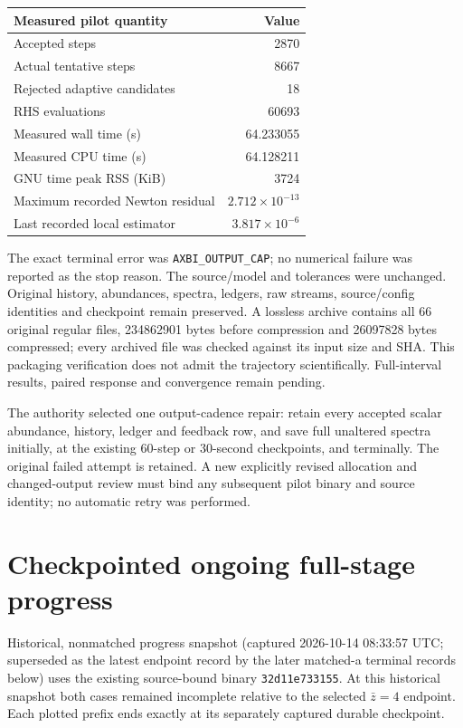 \documentclass[11pt]{article}
\begin{document}
\begin{center}
\begin{tabular}{lr}\toprule
Measured pilot quantity & Value\\\midrule
Accepted steps & 2870\\
Actual tentative steps & 8667\\
Rejected adaptive candidates & 18\\
RHS evaluations & 60693\\
Measured wall time (s) & 64.233055\\
Measured CPU time (s) & 64.128211\\
GNU time peak RSS (KiB) & 3724\\
Maximum recorded Newton residual & $2.712\times10^{-13}$\\
Last recorded local estimator & $3.817\times10^{-6}$\\\bottomrule
\end{tabular}
\end{center}

The exact terminal error was \texttt{AXBI\_OUTPUT\_CAP}; no numerical failure was reported as the stop reason. The source/model and tolerances were unchanged. Original history, abundances, spectra, ledgers, raw streams, source/config identities and checkpoint remain preserved. A lossless archive contains all 66 original regular files, 234862901 bytes before compression and 26097828 bytes compressed; every archived file was checked against its input size and SHA. This packaging verification does not admit the trajectory scientifically. Full-interval results, paired response and convergence remain pending.

The authority selected one output-cadence repair: retain every accepted scalar abundance, history, ledger and feedback row, and save full unaltered spectra initially, at the existing 60-step or 30-second checkpoints, and terminally. The original failed attempt is retained. A new explicitly revised allocation and changed-output review must bind any subsequent pilot binary and source identity; no automatic retry was performed.

\section{Checkpointed ongoing full-stage progress}
Historical, nonmatched progress snapshot (captured 2026-10-14 08:33:57 UTC; superseded as the latest endpoint record by the later matched-a terminal records below) uses the existing source-bound binary \texttt{32d11e733155}. At this historical snapshot both cases remained incomplete relative to the selected $\bar z=4$ endpoint. Each plotted prefix ends exactly at its separately captured durable checkpoint.
\end{document}
